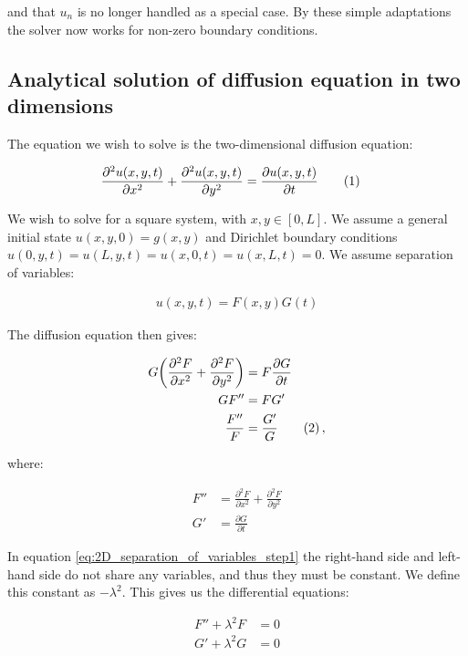 \documentclass[reprint,english,notitlepage]{revtex4-1}  %
\newcommand\numberthis{\addtocounter{equation}{1}\tag{\theequation}}
\begin{document}
and that $u_n$ is no longer handled as a special case. By these simple adaptations the solver now works for non-zero boundary conditions.



\subsection{Analytical solution of diffusion equation in two dimensions} \label{sec:formalism_2D_diff_eq_analytical}

The equation we wish to solve is the two-dimensional diffusion equation:

\begin{align*}
\frac{\partial^2 u(x,y,t)}{\partial x^2} + \frac{\partial^2 u(x,y,t)}{\partial y^2} &= \frac{\partial u(x,y,t)}{\partial t} \numberthis \label{eq:2D_diffusion_equation}
\end{align*}

We wish to solve for a square system, with $x,y \in [0,L]$. We assume a general initial state $u(x,y,0) = g(x,y)$ and Dirichlet boundary conditions $u(0,y,t) = u(L,y,t) = u(x,0,t) = u(x,L,t) = 0$. We assume separation of variables:

\begin{align*}
u(x,y,t) = F(x,y) G(t)
\end{align*}

The diffusion equation then gives:

\begin{align*}
G\bigg( \frac{\partial^2 F}{\partial x^2} + \frac{\partial^2 F}{\partial y^2} \bigg) &= F\frac{\partial G}{\partial t} \\
GF'' &= FG'\\
\frac{F''}{F} &= \frac{G'}{G} \numberthis \label{eq:2D_separation_of_variables_step1} \, ,
\end{align*}

where:

\begin{align*}
F'' &= \frac{\partial^2 F}{\partial x^2} + \frac{\partial^2 F}{\partial y^2} \\
G' &= \frac{\partial G}{\partial t}
\end{align*}

In equation \eqref{eq:2D_separation_of_variables_step1} the right-hand side and left-hand side do not share any variables, and thus they must be constant. We define this constant as $-\lambda^2$. This gives us the differential equations:

\begin{align*}
F'' + \lambda^2 F &= 0 \\
G' + \lambda^2 G &= 0
\end{align*}
\end{document}
